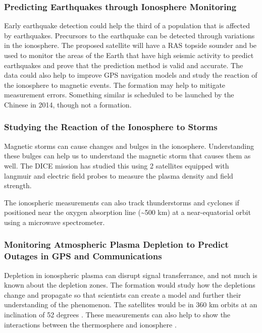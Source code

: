 \subsubsection{Predicting Earthquakes through Ionosphere Monitoring}

Early earthquake detection could help the third of a population that is affected by earthquakes. Precursors to the earthquake can be detected through variations in the ionosphere. The proposed satellite will have a RAS topside sounder and be used to monitor the areas of the Earth that have high seismic activity to predict earthquakes and prove that the prediction method is valid and accurate. The data could also help to improve GPS navigation models and study the reaction of the ionosphere to magnetic events. The formation may help to mitigate measurement errors.\cite{Ref:Jason} Something similar is scheduled to be launched by the Chinese in 2014, though not a formation\cite{Ref:Earthquake}. 


\subsubsection{Studying the Reaction of the Ionosphere to Storms }

Magnetic storms can cause changes and bulges in the ionosphere. Understanding these bulges can help us to understand the magnetic storm that causes them as well. The DICE mission has studied this using 2 satellites equipped with langmuir and electric field probes to measure the plasma density and field strength. \cite{Ref:Crowley,Ref:Fish}

The ionospheric measurements can also track thunderstorms and cyclones if positioned near the oxygen absorption line (\textasciitilde{}500 km) at a near-equatorial orbit using a microwave spectrometer. \cite{Ref:Blackwell}


\subsubsection{Monitoring Atmospheric Plasma Depletion to Predict Outages in GPS and Communications}

Depletion in ionospheric plasma can disrupt signal transferrance, and not much is known about the depletion zones. The formation would study how the depletions change and propagate so that scientists can create a model and further their understanding of the phenomenon. The satellites would be in 360 km orbits at an inclination of 52 degrees
\cite{Ref:Krause}\cite{Ref:Bracikowski}. These measurements can also help to show the interactions between the thermosphere and ionosphere \cite{Ref:Blalthazor}.

